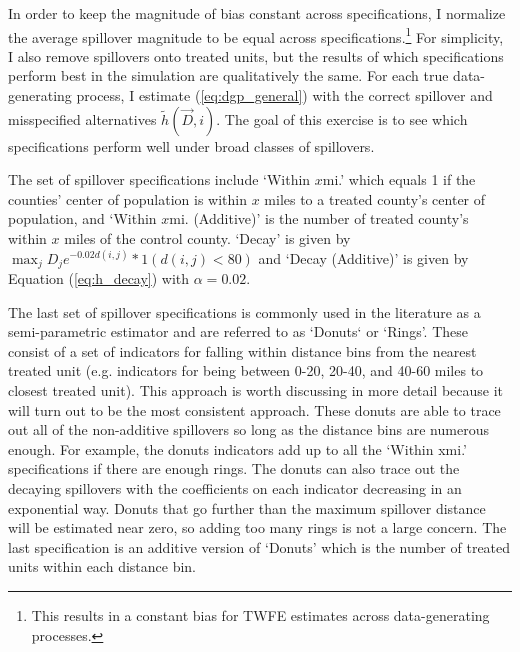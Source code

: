 \documentclass[11pt]{article}
\begin{document}
In order to keep the magnitude of bias constant across specifications, I normalize the average spillover magnitude to be equal across specifications.\footnote{This results in a constant bias for TWFE estimates across data-generating processes.} For simplicity, I also remove spillovers onto treated units, but the results of which specifications perform best in the simulation are qualitatively the same. For each true data-generating process, I estimate (\ref{eq:dgp_general}) with the correct spillover and misspecified alternatives $\tilde{h}(\vec{D}, i)$. The goal of this exercise is to see which specifications perform well under broad classes of spillovers.

The set of spillover specifications include `Within $x$mi.' which equals 1 if the counties' center of population is within $x$ miles to a treated county's center of population, and `Within $x$mi. (Additive)' is the number of treated county's within $x$ miles of the control county. `Decay' is given by $\max_j D_j e^{-0.02 d(i,j)} * 1(d(i,j) < 80)$ and `Decay (Additive)' is given by Equation (\ref{eq:h_decay}) with $\alpha = 0.02$. 

The last set of spillover specifications is commonly used in the literature as a semi-parametric estimator and are referred to as `Donuts` or `Rings'. These consist of a set of indicators for falling within distance bins from the nearest treated unit (e.g. indicators for being between 0-20, 20-40, and 40-60 miles to closest treated unit). This approach is worth discussing in more detail because it will turn out to be the most consistent approach. These donuts are able to trace out all of the non-additive spillovers so long as the distance bins are numerous enough. For example, the donuts indicators add up to all the `Within xmi.' specifications if there are enough rings. The donuts can also trace out the decaying spillovers with the coefficients on each indicator decreasing in an exponential way. Donuts that go further than the maximum spillover distance will be estimated near zero, so adding too many rings is not a large concern. The last specification is an additive version of `Donuts' which is the number of treated units within each distance bin.
\end{document}
